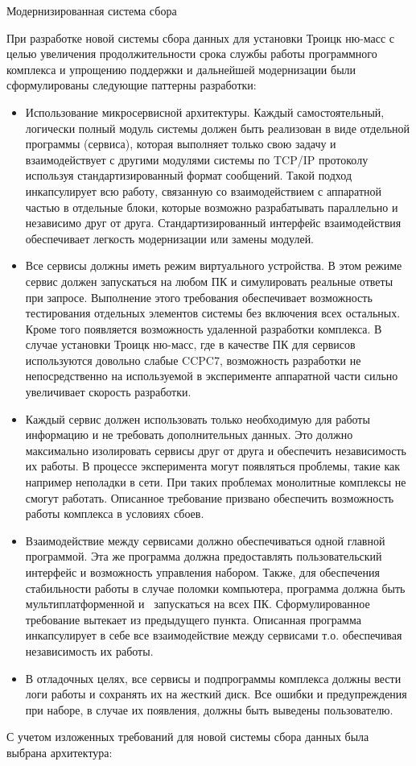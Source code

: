 \documentclass{article}
\title{}
\begin{document}
Модернизированная система сбора

При разработке новой системы сбора данных для установки Троицк ню-масс с целью увеличения продолжительности срока службы работы программного комплекса и упрощению поддержки и дальнейшей модернизации были сформулированы следующие паттерны разработки:

\begin{itemize}
\item Использование микросервисной архитектуры. Каждый самостоятельный, логически полный модуль системы должен быть реализован в виде отдельной программы (сервиса), которая выполняет только свою задачу и взаимодействует с другими модулями системы по TCP/IP протоколу используя стандартизированный формат сообщений. Такой подход инкапсулирует всю работу, связанную со взаимодействием с аппаратной частью в отдельные блоки, которые возможно разрабатывать параллельно и независимо друг от друга. Стандартизированный интерфейс взаимодействия обеспечивает легкость модернизации или замены модулей.
\item Все сервисы должны иметь режим виртуального устройства. В этом режиме сервис должен запускаться на любом ПК и симулировать реальные ответы при запросе. Выполнение этого требования обеспечивает возможность тестирования отдельных элементов системы без включения всех остальных. Кроме того появляется возможность удаленной разработки комплекса. В случае установки Троицк ню-масс, где в качестве ПК для сервисов используются довольно слабые CCPC7, возможность разработки не непосредственно на используемой в эксперименте аппаратной части сильно увеличивает скорость разработки.
\item Каждый сервис должен использовать только необходимую для работы информацию и не требовать дополнительных данных. Это должно максимально изолировать сервисы друг от друга и обеспечить независимость их работы. В процессе эксперимента могут появляться проблемы, такие как например неполадки в сети. При таких проблемах монолитные комплексы не смогут работать. Описанное требование призвано обеспечить возможность работы комплекса в условиях сбоев.
\item Взаимодействие между сервисами должно обеспечиваться одной главной программой. Эта же программа должна предоставлять пользовательский интерфейс и возможность управления набором. Также, для обеспечения стабильности работы в случае поломки компьютера, программа должна быть мультиплатформенной и \ запускаться на всех ПК. Сформулированное требование вытекает из предыдущего пункта. Описанная программа инкапсулирует в себе все взаимодействие между сервисами т.о. обеспечивая независимость их работы.
\item В отладочных целях, все сервисы и подпрограммы комплекса должны вести логи работы и сохранять их на жесткий диск. Все ошибки и предупреждения при наборе, в случае их появления, должны быть выведены пользователю.
\end{itemize}
С учетом изложенных требований для новой системы сбора данных была выбрана архитектура:
\end{document}
